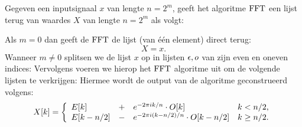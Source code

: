 \begin{algo}
Gegeven een inputsignaal $x$ van lengte $n=2^m$, geeft het algoritme $\text{FFT}$ 
een lijst terug van waardes $X$ van lengte $n=2^m$ als volgt:

Als $m=0$ dan geeft de $\text{FFT}$ de lijst (van \'e\'en element) direct terug:
\[
X = x.
\]
Wanneer $m\neq0$ splitsen we de lijst $x$ op in lijsten $\epsilon,o$ van zijn even en oneven indices:
Vervolgens voeren we hierop het $\text{FFT}$ algoritme uit om de volgende lijsten te verkrijgen:
Hiermee wordt de output van de algoritme geconstrueerd volgens:
\[
  X[k] = \left\{\begin{array}{llll}
    E[k]         &+& e^{-{2\pi i} k/n}\cdot O[k] &  k< n/2, \\
    E[k-n/2] &-& e^{-{2\pi i} (k-n/2)/n}\cdot O[k-n/2] &  k\geq n/2.
  \end{array}\right.
\]
\end{algo}

